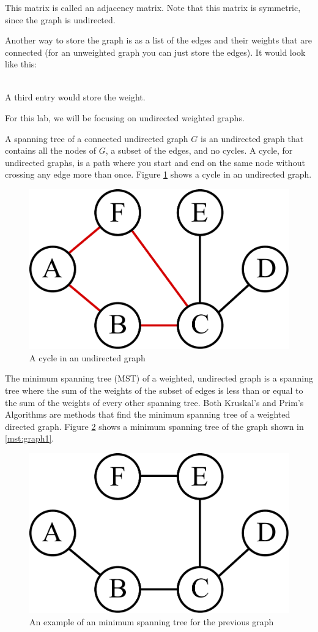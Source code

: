 This matrix is called an adjacency matrix.
Note that this matrix is symmetric, since the graph is undirected. 

Another way to store the graph is as a list of the edges and their weights that are connected (for an unweighted graph you can just store the edges).
It would look like this:

\begin{align*}
[('A', 'B'),
 ('B', 'C'),
 ('B', 'E'),
 ('B', 'F'),
 ('C', 'D'),\\
 ('C', 'E'),
 ('C', 'F'),
 ('D', 'E'),
 ('E', 'F')]
\end{align*}

A third entry would store the weight.

For this lab, we will be focusing on undirected weighted graphs. 

A spanning tree of a connected undirected graph $G$ is an undirected graph that contains all the nodes of $G$, a subset of the edges, and no cycles.
A cycle, for undirected graphs, is a path where you start and end on the same node without crossing any edge more than once.
Figure \ref{mst:graph3} shows a cycle in an undirected graph.

\begin{figure}[H]
\includegraphics[width = .4\textwidth]{graph3.pdf}
\caption{A cycle in an undirected graph}
\label{mst:graph3}
\end{figure}

The minimum spanning tree (MST) of a weighted, undirected graph is a spanning tree where the sum of the weights of the subset of edges is less than or equal to the sum of the weights of every other spanning tree.
Both Kruskal's and Prim's Algorithms are methods that find the minimum spanning tree of a weighted directed graph.
Figure \ref{mst:graph2} shows a minimum spanning tree of the graph shown in \ref{mst:graph1}.

\begin{figure}[H]
\includegraphics[width = .4\textwidth]{graph2.pdf}
\caption{An example of an minimum spanning tree for the previous graph}
\label{mst:graph2}
\end{figure}

